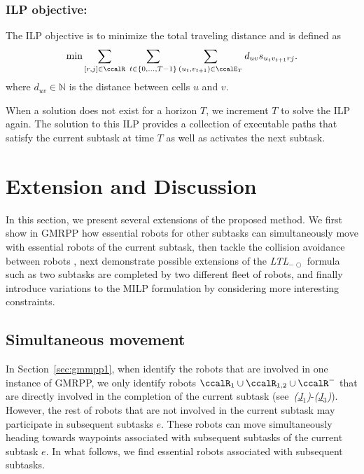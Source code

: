 \documentclass[Afour,sageh,times]{sagej}
\newcommand{\ltl}{ {\it LTL}$_{-\bigcirc}$ }
\begin{document}
{{\subsubsection{ILP objective:} The ILP objective is to minimize the total traveling distance and is defined as
\begingroup\makeatletter\def\f@size{10}\check@mathfonts
\def\maketag@@@#1{\hbox{\m@th\normalsize\normalfont#1}}%
\begingroup
\begin{align}
  \text{min} \sum_{[r,j] \in \ccalR} \; \sum_{t\in \{0,\ldots, T-1\}} \sum_{(u_t, v_{t+1}) \in \ccalE_T} d_{uv} s_{u_{t} v_{t+1} r j}   .
\end{align}
\endgroup
where $d_{uv} \in \mathbb{N}$ is the distance between cells $u$ and $v$.

When a solution does not exist for a horizon $T$, we increment $T$ to solve the ILP again.  The solution to this ILP provides  a collection of executable paths that satisfy  the current subtask at time $T$  as well as activates the next subtask.

\section{Extension and Discussion}\label{sec:extension}
In this section, we present several extensions of the proposed method. We first show in GMRPP  how essential robots for other subtasks  can simultaneously move with essential robots of the current subtask, then  tackle the collision avoidance between robots ,  next demonstrate possible extensions of the \ltl formula such as two subtasks are completed by two different fleet of robots, and finally introduce variations to the MILP formulation by considering more interesting constraints.


\subsection{Simultaneous movement}\label{sec:extension_essential}
In Section~\ref{sec:gmmpp1}, when identify the robots that are involved in one instance of GMRPP, we only identify robots $\ccalR_1 \cup \ccalR_{1,2} \cup \ccalR^-$ that are directly involved in the completion of the current subtask (see~{\it (\hyperref[sec:essential_a]{J$_1$})}-{\it (\hyperref[sec:essential_c]{J$_3$})}). However, the rest of robots that are not involved in the current subtask may participate in subsequent subtasks $e$. These robots can move simultaneously  heading towards  waypoints associated with subsequent subtasks of the current subtask $e$. In what follows, we find essential robots associated with subsequent subtasks.

}}
\end{document}
